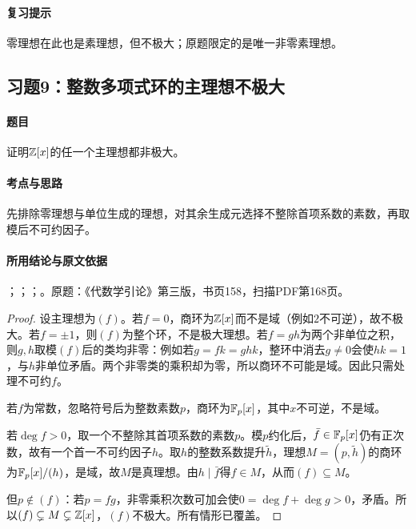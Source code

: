 \paragraph{复习提示}

零理想在此也是素理想，但不极大；原题限定的是唯一非零素理想。

\subsection{习题9：整数多项式环的主理想不极大}

\label{ex:4:9}

\paragraph{题目}

证明$\mathbb Z[x]$的任一个主理想都非极大。

\paragraph{考点与思路}

先排除零理想与单位生成的理想，对其余生成元选择不整除首项系数的素数，再取模后不可约因子。

\paragraph{所用结论与原文依据}

；；；。原题：《代数学引论》第三版，书页158，扫描PDF第168页。


\begin{proof}

设主理想为$(f)$。若$f=0$，商环为$\mathbb Z[x]$而不是域（例如$2$不可逆），故不极大。若$f=\pm1$，则$(f)$为整个环，不是极大理想。若$f=gh$为两个非单位之积，则$g,h$取模$(f)$后的类均非零：例如若$g=fk=ghk$，整环中消去$g\ne0$会使$hk=1$，与$h$非单位矛盾。两个非零类的乘积却为零，所以商环不可能是域。因此只需处理不可约$f$。

若$f$为常数，忽略符号后为整数素数$p$，商环为$\mathbb F_p[x]$，其中$x$不可逆，不是域。

若$\deg f>0$，取一个不整除其首项系数的素数$p$。模$p$约化后，$\bar f\in\mathbb F_p[x]$仍有正次数，故有一个首一不可约因子$h$。取$h$的整数系数提升$\widetilde h$，理想$M=(p,\widetilde h)$的商环为$\mathbb F_p[x]/(h)$，是域，故$M$是真理想。由$h\mid\bar f$得$f\in M$，从而$(f)\subseteq M$。

但$p\notin(f)$：若$p=fg$，非零乘积次数可加会使$0=\deg f+\deg g>0$，矛盾。所以$(f)\subsetneq M\subsetneq\mathbb Z[x]$，$(f)$不极大。所有情形已覆盖。

\end{proof}


